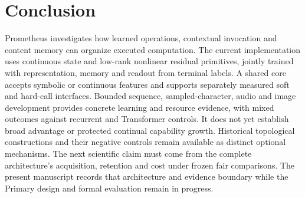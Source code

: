 \section{Conclusion}
\label{sec:conclusion}

Prometheus investigates how learned operations, contextual invocation and
content memory can organize executed computation. The current implementation
uses continuous state and low-rank nonlinear residual primitives, jointly
trained with representation, memory and readout from terminal labels. A
shared core accepts symbolic or continuous features and supports separately
measured soft and hard-call interfaces. Bounded sequence, sampled-character,
audio and image development provides concrete learning and resource evidence,
with mixed outcomes against recurrent and Transformer controls. It does not
yet establish broad advantage or protected continual capability growth.
Historical topological constructions and their negative controls remain
available as distinct optional mechanisms. The next scientific claim must
come from the complete architecture's acquisition, retention and cost under
frozen fair comparisons. The present manuscript records that architecture
and evidence boundary while the Primary design and formal evaluation remain
in progress.
